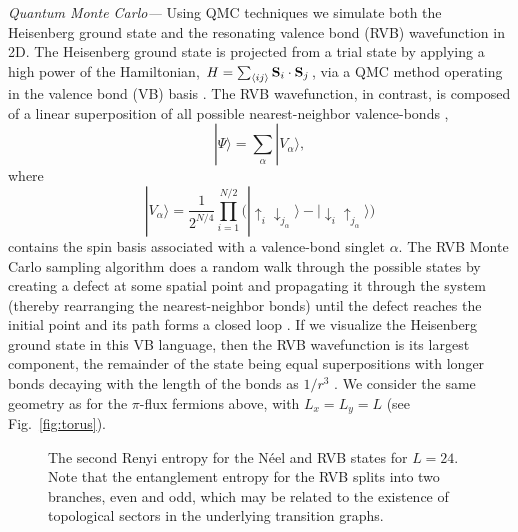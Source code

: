\documentclass[prl,aps,twocolumn,floatfix,amsmath,amssymb,superscriptaddress,tightenlines]{revtex4}
\begin{document}
{\it Quantum Monte Carlo---}
Using QMC techniques we simulate both the
Heisenberg ground state and the resonating valence bond (RVB)
wavefunction in 2D.  The Heisenberg ground state is
projected from a trial state by applying a high power of the
Hamiltonian, $H = \sum_{\langle ij \rangle} {\bf S}_i \cdot {\bf S}_j$, via a QMC method operating in the valence bond (VB)
basis \cite{Sandvik}. %
The RVB wavefunction, in contrast, 
is composed of a linear superposition of all possible 
nearest-neighbor valence-bonds \cite{RVB1,RVB2},
\begin{equation}
| \Psi \rangle = \sum_{\alpha} | V_{\alpha} \rangle,
\end{equation}
where
\begin{equation}
|V_{\alpha} \rangle =  \frac{1}{2^{N/4}} \prod_{i=1}^{N/2} \big( | \uparrow_i \downarrow_{j_{\alpha}} \rangle -  | \downarrow_i  \uparrow_{j_{\alpha}} \rangle \big)
\end{equation}
contains the spin basis associated with a valence-bond singlet $\alpha$.
The RVB 
Monte Carlo sampling
algorithm does a random walk through the possible states by creating a
defect at some spatial point and propagating it through the system (thereby
rearranging the nearest-neighbor bonds) until the defect reaches the
initial point and its path forms a closed loop \cite{AWSloop}.
If we visualize the Heisenberg ground state in this VB language, then the RVB wavefunction is its largest component, the remainder of the state being equal superpositions with longer bonds decaying with the length of the bonds as $1/r^3$ \cite{Sandvik}.
We consider the same geometry as for the $\pi$-flux fermions above, with $L_x=L_y=L$ (see Fig.~\ref{fig:torus}).

 \begin{figure}
   \begin{center}
   \end{center}
   \caption{ The second Renyi entropy for the N\'eel and RVB states for $L=24$. Note that the entanglement entropy for the RVB splits into two branches, even and odd, which may be related to the existence of topological sectors in the underlying transition graphs.
   \label{fig:heis_bow} }
 \end{figure}
\end{document}
